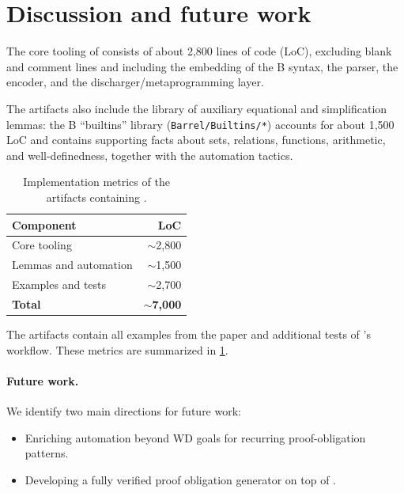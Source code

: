 \section{Discussion and future work}

The core tooling of \barrel consists of about 2{,}800 lines of code (LoC), excluding blank and comment lines and including the embedding of the B syntax, the parser, the encoder, and the discharger/\allowbreak metaprogramming layer.

The artifacts also include the library of auxiliary equational and simplification lemmas: the B ``builtins'' library (\texttt{Barrel/Builtins/*}) accounts for about 1{,}500 LoC and contains supporting facts about sets, relations, functions, arithmetic, and well-definedness, together with the automation tactics.



\begin{table}[t]
	\caption{Implementation metrics of the artifacts containing \barrel.}
	\label{tab:implementation-metrics}
	\centering
	\begin{tabular}{l@{\kern5em}r}
		\textbf{Component}    & \textbf{LoC}               \\
		\hline
		Core tooling          & \({\sim}\)2{,}800          \\
		Lemmas and automation & \({\sim}\)1{,}500          \\
		Examples and tests    & \({\sim}\)2{,}700          \\
		\hline
		\textbf{Total}        & \({\sim}\)\textbf{7{,}000} \\
	\end{tabular}
\end{table}

The artifacts contain all examples from the paper and additional tests of \barrel's workflow.
These metrics are summarized in \cref{tab:implementation-metrics}.

\paragraph*{Future work.}

We identify two main directions for future work:
\begin{itemize}
	\item Enriching automation beyond WD goals for recurring proof-obligation patterns.
	\item Developing a fully verified proof obligation generator on top of \barrel.
\end{itemize}



